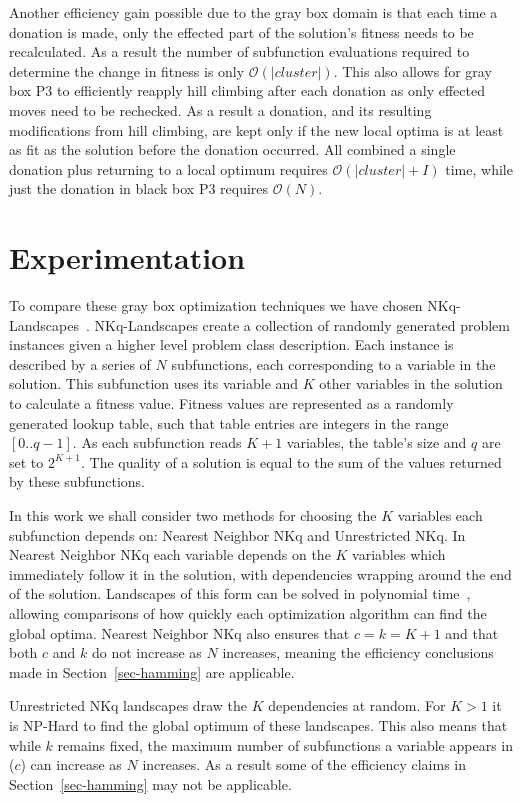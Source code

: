 \documentclass{sig-alternate}
\newcommand{\BigO}[1]{$\mathcal{O}{(#1)}$}
\begin{document}
Another efficiency gain possible due to the gray box domain is that each time a
donation is made, only the effected part of the solution's fitness needs to be
recalculated. As a result the number of subfunction evaluations required
to determine the change in fitness is only \BigO{|cluster|}. This also
allows for gray box P3 to efficiently reapply hill climbing after each
donation as only effected moves need to be rechecked. As a result a donation,
and its resulting modifications from hill climbing, are kept only if the
new local optima is at least as fit as the solution before the donation occurred.
All combined a single donation plus returning to a local optimum requires \BigO{|cluster| + I} time,
while just the donation in black box P3 requires \BigO{N}.

\section{Experimentation}
\label{sec-experiments}
To compare these gray box optimization techniques we have chosen
NKq-Landscapes~\cite{chicano:2014:ball}. NKq-Landscapes create
a collection of randomly generated problem instances given a
higher level problem class description. Each instance is described
by a series of $N$ subfunctions, each corresponding to a variable
in the solution. This subfunction uses its variable and $K$ other
variables in the solution to calculate a fitness value. Fitness values
are represented as a randomly generated lookup table, such that table
entries are integers in the range $[0..q-1]$. As each subfunction reads
$K+1$ variables, the table's size and $q$ are set to $2^{K+1}$. The quality
of a solution is equal to the sum of the values returned by these subfunctions.

In this work we shall consider two methods for choosing the $K$ variables
each subfunction depends on: Nearest Neighbor NKq and Unrestricted NKq.
In Nearest Neighbor NKq each variable depends on the $K$ variables which immediately follow
it in the solution, with dependencies wrapping around the end of the solution.
Landscapes of this form can be solved in polynomial
time~\cite{wright:2000:solvingnk}, allowing comparisons of how quickly each optimization
algorithm can find the global optima. Nearest Neighbor NKq also ensures that $c=k=K+1$
and that both $c$ and $k$ do not increase as $N$ increases, meaning the efficiency
conclusions made in Section~\ref{sec-hamming} are applicable.

Unrestricted NKq landscapes draw the $K$ dependencies at random. For $K > 1$ it is
NP-Hard to find the global optimum of these landscapes. This also means that while
$k$ remains fixed, the maximum number of subfunctions a variable appears in ($c$) can increase
as $N$ increases. As a result some of the efficiency claims in Section~\ref{sec-hamming}
may not be applicable.
\end{document}
